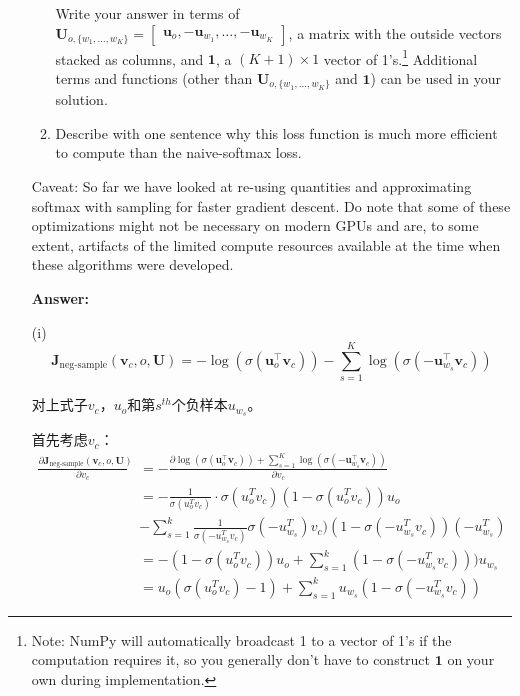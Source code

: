 \documentclass{article}
\newenvironment{answer}{
    {\bf Answer:} \sf \begingroup \color{red}%
}{\par\endgroup}%
\begin{document}
\begin{enumerate}[label=(\alph*)]
\begin{enumerate}[label=(\roman*)]
Write your answer in terms of \\ $\bm{U}_{o, \{w_1, \dots, w_K\}} = \begin{bmatrix} \bm{u}_o, -\bm{u}_{w_1}, \dots, -\bm{u}_{w_K} \end{bmatrix}$, a matrix with the outside vectors stacked as columns, and $\bm{1}$, a $(K + 1) \times 1$ vector of 1's.\footnote{Note: NumPy will automatically broadcast 1 to a vector of 1's if the computation requires it, so you generally don't have to construct $\bm{1}$ on your own during implementation.}
Additional terms and functions (other than $\bm{U}_{o, \{w_1, \dots, w_K\}}$ and $\bm{1}$) can be used in your solution.
\item Describe with one sentence why this loss function is much more efficient to compute than the naive-softmax loss.
\end{enumerate}

Caveat: So far we have looked at re-using quantities and approximating softmax with sampling for faster gradient descent. Do note that some of these optimizations might not be necessary on modern GPUs and are, to some extent, artifacts of the limited compute resources available at the time when these algorithms were developed.

\begin{shaded}
\begin{answer}
(i)
\begin{equation}
\bm J_{\text{neg-sample}}(\bm v_c, o, \bm U) = -\log(\sigma(\bm u_o^\top \bm v_c)) - \sum_{s=1}^K \log(\sigma(-\bm u_{w_s}^\top \bm v_c))
\end{equation}

对上式子$v_c$，$u_o$和第$s^{th}$个负样本$u_{w_s}$。

首先考虑$v_c$：
\begin{equation}
	\begin{array}{cl}
 \frac{\partial \bm J_{\text{neg-sample}}(\bm v_c, o, \bm U)}{\partial  v_c} &= -\frac{\partial \log(\sigma(\bm u_o^\top \bm v_c)) +\sum_{s=1}^K \log(\sigma(-\bm u_{w_s}^\top \bm v_c)) }{\partial v_c}\\
&= -\frac{1}{\sigma(u_o^T v_c)} \cdot \sigma(u_o^T v_c) (1- \sigma(u_o^T v_c) ) u_o \\
& - \sum_{s=1}^k \frac{1}{\sigma(-u_{w_s}^T v_c)}\sigma(-u_{w_s}^T)v_c) (1-\sigma(-u_{w_s}^T v_c)) (-u_{w_s}^T)	\\
&= - (1-\sigma(u_o^T v_c))u_o +\sum_{s=1}^k(1-\sigma(-u_{w_s}^T v_c))) u_{w_s}\\
&= u_o (\sigma(u_o^T v_c)-1) + \sum_{s=1}^k u_{w_s} (1- \sigma(-u_{w_s}^T v_c))
\end{array}
\end{equation}



\end{answer}
\end{shaded}
\end{enumerate}
\end{document}
